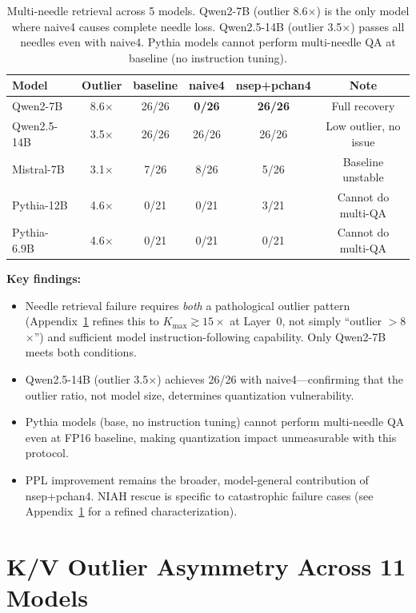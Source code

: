 \documentclass[11pt]{article}
\begin{document}
\begin{table}[h]
\centering
\small
\begin{tabular}{lccccc}
\toprule
Model & Outlier & baseline & naive4 & nsep+pchan4 & Note \\
\midrule
Qwen2-7B & 8.6$\times$ & 26/26 & \textbf{0/26} & \textbf{26/26} & Full recovery \\
Qwen2.5-14B & 3.5$\times$ & 26/26 & 26/26 & 26/26 & Low outlier, no issue \\
Mistral-7B & 3.1$\times$ & 7/26 & 8/26 & 5/26 & Baseline unstable \\
Pythia-12B & 4.6$\times$ & 0/21 & 0/21 & 3/21 & Cannot do multi-QA \\
Pythia-6.9B & 4.6$\times$ & 0/21 & 0/21 & 0/21 & Cannot do multi-QA \\
\bottomrule
\end{tabular}
\caption{Multi-needle retrieval across 5 models. Qwen2-7B (outlier 8.6$\times$) is the only model where naive4 causes complete needle loss. Qwen2.5-14B (outlier 3.5$\times$) passes all needles even with naive4. Pythia models cannot perform multi-needle QA at baseline (no instruction tuning).}
\label{tab:niah_multi}
\end{table}

\textbf{Key findings:}
\begin{itemize}[nosep]
  \item Needle retrieval failure requires \emph{both} a pathological outlier pattern (Appendix~\ref{sec:kv_asymmetry} refines this to $K_{\max} \gtrsim 15\times$ at Layer~0, not simply ``outlier $>$8$\times$'') and sufficient model instruction-following capability. Only Qwen2-7B meets both conditions.
  \item Qwen2.5-14B (outlier 3.5$\times$) achieves 26/26 with naive4---confirming that the outlier ratio, not model size, determines quantization vulnerability.
  \item Pythia models (base, no instruction tuning) cannot perform multi-needle QA even at FP16 baseline, making quantization impact unmeasurable with this protocol.
  \item PPL improvement remains the broader, model-general contribution of nsep+pchan4. NIAH rescue is specific to catastrophic failure cases (see Appendix~\ref{sec:kv_asymmetry} for a refined characterization).
\end{itemize}

\section{K/V Outlier Asymmetry Across 11 Models}
\label{sec:kv_asymmetry}
\end{document}
